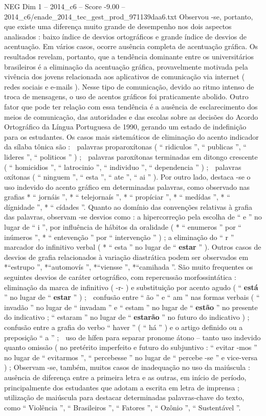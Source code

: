 \begin{textsample}{NEG Dim 1 – 2014\_c6 – Score -9.00 – 2014\_c6/enade\_2014\_tec\_gest\_prod\_971139daa6.txt}
Observou -se, portanto, que existe uma diferença muito grande de desempenho nos dois aspectos analisados : baixo índice de desvios ortográficos e grande índice de desvios de acentuação.
Em vários casos, ocorre ausência completa de acentuação gráfica.
Os resultados revelam, portanto, que a tendência dominante entre os universitários brasileiros é a eliminação da acentuação gráfica, provavelmente motivada pela vivência dos jovens relacionada aos aplicativos de comunicação via internet ( redes sociais e e-mails ).
Nesse tipo de comunicação, devido ao ritmo intenso de troca de mensagens, o uso de acentos gráficos foi praticamente abolido.
Outro fator que pode ter relação com essa tendência é a ausência de esclarecimento dos meios de comunicação, das autoridades e das escolas sobre as decisões do Acordo Ortográfico da Língua Portuguesa de 1990, gerando um estado de indefinição para os estudantes.
Os casos mais sistemáticos de eliminação do acento indicador da sílaba tônica são :  palavras proparoxítonas ( “ ridiculos ”, “ publicas ”, “ lideres ”, “ politicos ” ) ;  palavras paroxítonas terminadas em ditongo crescente ( “ homicidios ”, “ latrocinio ”, “ individuo ”, “ dependencia ” ) ;  palavras oxítonas ( “ ninguem ”, “ esta ”, “ ate ”, “ ai ” ).
Por outro lado, destaca -se o uso indevido do acento gráfico em determinadas palavras, como observado nas grafias * “ jornáis ”, * “ telejornaís ”, * “ propíciar ”, * “ medídas ”, * “ dígnidade ”, * “ cídades ”.
Quanto ao domínio das convenções relativas à grafia das palavras, observam -se desvios como : a hipercorreção pela escolha de “ e ” no lugar de “ i ”, por influência de hábitos da oralidade ( * “ enumeros ” por “ inúmeros ”, * “ entevenção ” por “ intervenção ” ) ; a eliminação do “ r ” marcador do infinitivo verbal ( * “ esta ” no lugar de “ \textbf{estar} ” ).
Outros casos de desvios de grafia relacionados à variação diastrática podem ser observados em *“estrupo ”, *“automovís ”, *“viensse ”, *“camihada ”.
São muito frequentes os seguintes desvios de caráter ortográfico, com repercussão morfossintática :  eliminação da marca de infinitivo ( -r- ) e substituição por acento agudo ( “ \textbf{está} ” no lugar de “ \textbf{estar} ” ) ;  confusão entre “ ão ” e “ am ” nas formas verbais ( “ invadão ” no lugar de “ invadam ” e “ estam ” no lugar de “ \textbf{estão} ” no presente do indicativo ; “ estaram ” no lugar de “ \textbf{estarão} ” no futuro do indicativo ) ;  confusão entre a grafia do verbo “ haver ” ( “ há ” ) e o artigo definido ou a preposição “ a ” ;  uso de hífen para separar pronome átono – tanto uso indevido quanto omissão ( no pretérito imperfeito e futuro do subjuntivo : “ evitar -mos ” no lugar de “ evitarmos ”, “ percebesse ” no lugar de “ percebe -se ” e vice-versa ) ; Observam -se, também, muitos casos de inadequação no uso da maiúscula : ausência de diferença entre a primeira letra e as outras, em início de período, principalmente dos estudantes que adotam a escrita em letra de imprensa ; utilização de maiúscula para destacar determinadas palavras-chave do texto, como “ Violência ”, “ Brasileiros ”, “ Fatores ”, “ Ozônio ”, “ Sustentável ”.

\end{textsample}
